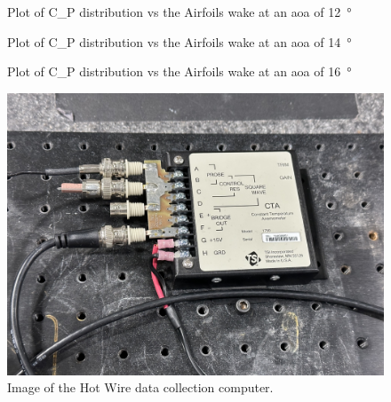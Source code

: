 \begin{figure}[htpb]
    \centering
    
    \caption[plot of the coefficient of pressure vs the angle of attack at Twelve degrees.]{Plot of \gls{C_P} distribution vs the Airfoils wake at an \acrshort{aoa} of \qty{12} {\degree}}
    \label{fig:C_p Distribution of Airfoil Wake at 12° AOA.svg}
\end{figure}

\begin{figure}[htpb]
    \centering
    
    \caption[plot of the coefficient of pressure vs the angle of attack at fourteen degrees.]{Plot of \gls{C_P} distribution vs the Airfoils wake at an \acrshort{aoa} of \qty{14} {\degree}}
    \label{fig:C_p Distribution of Airfoil Wake at 14° AOA.svg}
\end{figure}

\begin{figure}[htpb]
    \centering
    
    \caption[plot of the coefficient of pressure vs the angle of attack at sixteen degrees.]{Plot of \gls{C_P} distribution vs the Airfoils wake at an \acrshort{aoa} of \qty{16} {\degree}}
    \label{fig:C_p Distribution of Airfoil Wake at 16° AOA.svg}
\end{figure}

\begin{figure}[htpb]
    \centering
    \includegraphics[width=0.75\linewidth]{Figures/IMG_3193.jpeg}
    \caption[Image of the Hot Wire data collection computer.]{Image of the Hot Wire data collection computer.}
    \label{fig: HotWireAndPitotComputer}
\end{figure}

